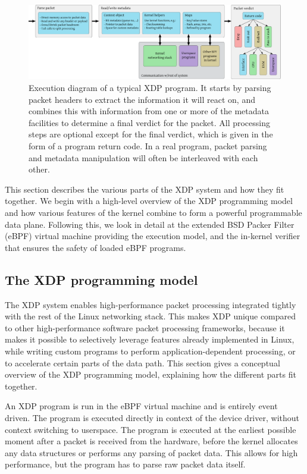 \documentclass[10pt]{sig-alternate-05-2015}
\begin{document}
\begin{figure}[t]
\centering
\includegraphics[width=\linewidth]{figures/xdp-execution-diagram.pdf}
\caption{\label{fig:xdp-execution} Execution diagram of a typical XDP program.
  It starts by parsing packet headers to extract the information it will react
  on, and combines this with information from one or more of the metadata
  facilities to determine a final verdict for the packet. All processing steps
  are optional except for the final verdict, which is given in the form of a
  program return code. In a real program, packet parsing and metadata
  manipulation will often be interleaved with each other.}
\end{figure}

This section describes the various parts of the XDP system and how they fit
together. We begin with a high-level overview of the XDP programming model and
how various features of the kernel combine to form a powerful programmable data
plane. Following this, we look in detail at the extended BSD Packer Filter
(eBPF) virtual machine providing the execution model, and the in-kernel verifier
that ensures the safety of loaded eBPF programs.

\subsection{The XDP programming model}
\label{sec:prog-model}
The XDP system enables high-performance packet processing integrated tightly
with the rest of the Linux networking stack. This makes XDP unique compared to
other high-performance software packet processing frameworks, because it makes
it possible to selectively leverage features already implemented in Linux, while
writing custom programs to perform application-dependent processing, or to
accelerate certain parts of the data path. This section gives a conceptual
overview of the XDP programming model, explaining how the different parts fit
together.

An XDP program is run in the eBPF virtual machine and is entirely event driven.
The program is executed directly in context of the device driver, without
context switching to userspace. The program is executed at the earliest possible
moment after a packet is received from the hardware, before the kernel allocates
any data structures or performs any parsing of packet data. This allows for high
performance, but the program has to parse raw packet data itself.
\end{document}
